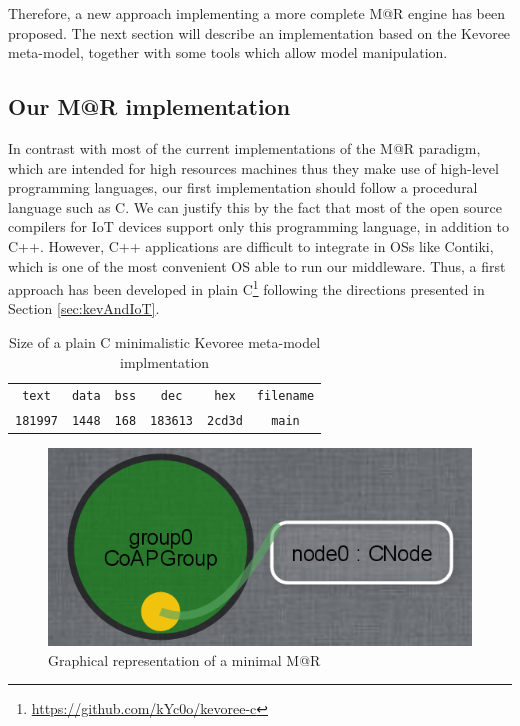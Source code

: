 Therefore, a new approach implementing a more complete M@R engine has been proposed.
The next section will describe an implementation based on the Kevoree meta-model, together with some tools which allow model manipulation.

\subsection{Our M@R implementation}
\label{subsec:MARImpl}
In contrast with most of the current implementations of the M@R paradigm, which are intended for high resources machines thus they make use of high-level programming languages, our first implementation should follow a procedural language such as C.
We can justify this by the fact that most of the open source compilers for IoT devices support only this programming language, in addition to C++.
However, C++ applications are difficult to integrate in OSs like Contiki, which is one of the most convenient OS able to run our middleware.
Thus, a first approach has been developed in plain C\footnote{\url{https://github.com/kYc0o/kevoree-c}} following the directions presented in Section \ref{sec:kevAndIoT}.

\begin{table}[]
	\centering
	\caption{Size of a plain C minimalistic Kevoree meta-model implmentation}
	\label{tab:kevoreeC}
	\begin{tabular}{cccccc}
		\texttt{text}   & \texttt{data} & \texttt{bss} & \texttt{dec}    & \texttt{hex}   & \texttt{filename} \\
		\texttt{181997} & \texttt{1448} & \texttt{168} & \texttt{183613} & \texttt{2cd3d} & \texttt{main}        
	\end{tabular}
\end{table}

\begin{figure}[]
	\centering
	\includegraphics[width=0.55\columnwidth]{chapters/modelsAtRuntimeContiki.images/1stModel.png}
	\caption{Graphical representation of a minimal M@R}
	\label{fig:1stModelC}
\end{figure}

